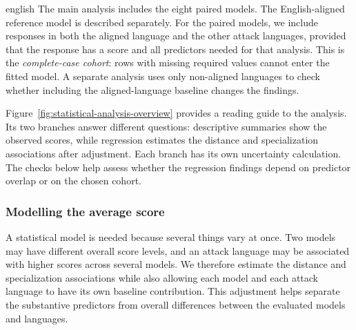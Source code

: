 \begin{otherlanguage*}{english}
The main analysis includes the eight paired models. The English-aligned reference model is described separately. For the paired models, we include responses in both the aligned language and the other attack languages, provided that the response has a score and all predictors needed for that analysis. This is the \emph{complete-case cohort}: rows with missing required values cannot enter the fitted model. A separate analysis uses only non-aligned languages to check whether including the aligned-language baseline changes the findings.


Figure~\ref{fig:statistical-analysis-overview} provides a reading guide to the analysis. Its two branches answer different questions: descriptive summaries show the observed scores, while regression estimates the distance and specialization associations after adjustment. Each branch has its own uncertainty calculation. The checks below help assess whether the regression findings depend on predictor overlap or on the chosen cohort.



\subsubsection{Modelling the average score}

A statistical model is needed because several things vary at once. Two models may have different overall score levels, and an attack language may be associated with higher scores across several models. We therefore estimate the distance and specialization associations while also allowing each model and each attack language to have its own baseline contribution. This adjustment helps separate the substantive predictors from overall differences between the evaluated models and languages.



\end{otherlanguage*}
